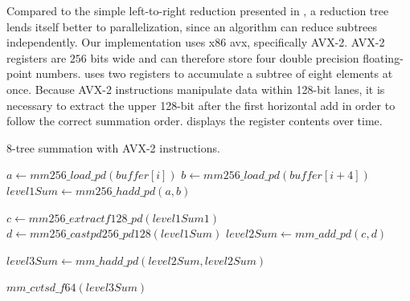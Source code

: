 Compared to the simple left-to-right reduction presented in , a reduction tree lends itself better to parallelization, since an algorithm can reduce subtrees independently.
Our implementation uses x86 \gls{avx}, specifically AVX-2.
AVX-2 registers are $256$ bits wide and can therefore store four double precision floating-point numbers.
 uses two registers to accumulate a subtree of eight elements at once.
Because AVX-2 instructions manipulate data within 128-bit lanes, it is necessary to extract the upper 128-bit after the first horizontal add in order to follow the correct summation order.
 displays the register contents over time.
\begin{algorithm}
\caption{8-tree summation with AVX-2 instructions.}
\label{algo:AVXTreeAccumulation}
\DontPrintSemicolon
\SetAlgoLined
{}

$a \gets mm256\_load\_pd(buffer[i])$\;
$b \gets mm256\_load\_pd(buffer[i + 4])$\;
$level1Sum \gets mm256\_hadd\_pd(a,b)$\;

$c \gets mm256\_extractf128\_pd(level1Sum 1)$\;
$d \gets mm256\_castpd256\_pd128(level1Sum)$\;
$level2Sum \gets mm\_add\_pd(c, d)$\;

$level3Sum \gets mm\_hadd\_pd(level2Sum, level2Sum)$\;

\Return $mm\_cvtsd\_f64(level3Sum)$\;
\end{algorithm}


